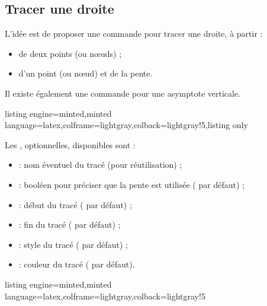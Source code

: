 \documentclass[11pt,a4paper]{ltxdoc}
\begin{document}
\subsection{Tracer une droite}\label{tracdroite}

L'idée est de proposer une commande pour tracer une droite, à partir :

\begin{itemize}
  \item de deux points (ou nœuds) ;
  \item d'un point (ou nœud) et de la pente.
\end{itemize}

Il existe également une commande pour une asymptote verticale.

\begin{tcblisting}{listing engine=minted,minted language=latex,colframe=lightgray,colback=lightgray!5,listing only}
\end{tcblisting}

Les \MontreCode{[clés]}, optionnelles, disponibles sont :

\smallskip

\begin{itemize}
  \item {} : nom éventuel du tracé (pour réutilisation) ;
  \item {} : booléen pour préciser que la pente est utilisée ( par défaut) ;
  \item {} : début du tracé ( par défaut) ;
  \item {} : fin du tracé ( par défaut) ;
  \item {} : style du tracé ( par défaut) ;
  \item {} : couleur du tracé ( par défaut).
\end{itemize}

\begin{tcblisting}{listing engine=minted,minted language=latex,colframe=lightgray,colback=lightgray!5}
\begin{GraphiqueTikz}%
  [x=0.8cm,y=1cm,Xmin=-7,Xmax=4,Ymin=-3,Ymax=5]
\end{GraphiqueTikz}
\end{tcblisting}
\end{document}
